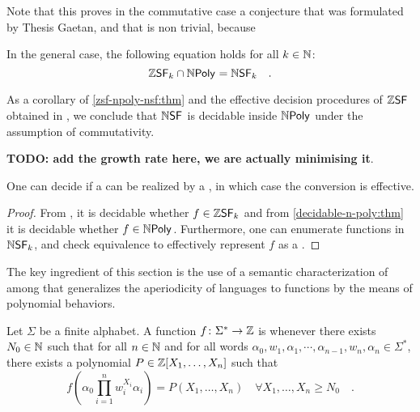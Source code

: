 Note that this proves in the commutative case a conjecture that was 
formulated by Thesis Gaetan, and that is non trivial, because 

\begin{conjecture}
    \label{nsf-zsf:conj}
    In the general case, the following equation holds for all $k \in \mathbb{N}$:
    \begin{equation*}
        \ZSF[k] \cap \NPoly
        = 
        \NSF[k]
        \quad .
    \end{equation*}
\end{conjecture}

As a corollary of \cref{zsf-npoly-nsf:thm} and the effective decision
procedures of $\ZSF$ obtained in \cite{LOPEZ23b}, we conclude that $\NSF$ is
decidable inside $\NPoly$ under the assumption of commutativity.

\textbf{TODO: add the growth rate here, we are actually minimising it}.
\begin{corollary}
    One can decide if a  
    can be realized by a ,
    in which case the conversion is effective.
\end{corollary}
\begin{proof}
    From \cite[Theorem V.13]{LOPEZ23b}, it is decidable whether
    $f \in \ZSF[k]$ and from \cref{decidable-n-poly:thm}
    it is decidable whether $f \in \NPoly$.
    Furthermore, one can enumerate functions in $\NSF[k]$,
    and check equivalence to effectively represent $f$ as a
    .
\end{proof}

The key ingredient of this section is the use of a semantic characterization of
 among 
that generalizes the aperiodicity of languages to functions by the means of
polynomial behaviors.

\begin{definition}
    \label{ultimately-polynomial:def}
    Let $\Sigma$ be a finite alphabet. 
    A function $f \colon \Sigma^* \to \mathbb{Z}$
    is 
    whenever there exists $N_0 \in \mathbb{N}$ such that
    for all $n \in \mathbb{N}$
    and for all words $\alpha_0, w_1, \alpha_1, \cdots, \alpha_{n-1}, w_n, \alpha_n
    \in \Sigma^*$, there exists a polynomial $P \in \mathbb{Z}[X_1, \dots, X_n]$
    such that
    \begin{equation*}
        f\left(
            \alpha_0 \prod_{i = 1}^{n} w_i^{X_i} \alpha_i
        \right)
        = 
        P(X_1, \dots, X_n)
        \quad 
        \forall X_1, \dots, X_n \geq N_0
        \quad .
    \end{equation*}
\end{definition}


